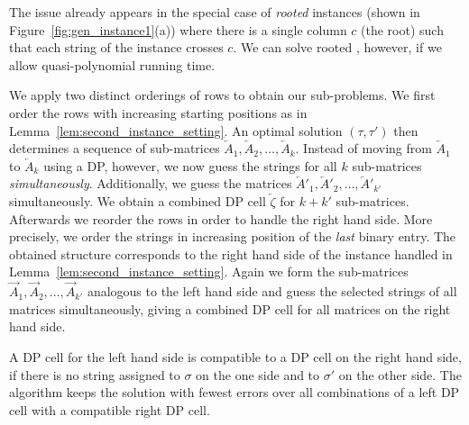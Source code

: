 The issue already appears in the special case of \emph{rooted} instances (shown in Figure~\ref{fig:gen_instance1}(a)) where there is a single column $c$ (the root) such that each string of the instance crosses $c$.
We can solve rooted \GMEC, however, if we allow quasi-polynomial running time.

We apply two distinct orderings of rows to obtain our sub-problems.
We first order the rows with increasing starting positions as in Lemma~\ref{lem:second_instance_setting}.
An optimal solution $(\tau,\tau')$ then determines a sequence of sub-matrices $\overleftarrow{A}_1,\overleftarrow{A}_2,\dotsc,\overleftarrow{A}_k$.
Instead of moving from $\overleftarrow{A}_1$ to $\overleftarrow{A}_k$ using a DP, however, we now guess the strings for all $k$ sub-matrices \emph{simultaneously}.
Additionally, we guess the matrices $\overleftarrow{A}'_1,\overleftarrow{A}'_2,\dotsc,\overleftarrow{A}'_{k'}$ simultaneously.
We obtain a combined DP cell $\overleftarrow{\zeta}$ for $k+k'$ sub-matrices.
Afterwards we reorder the rows in order to handle the right hand side.
More precisely, we order the strings in increasing position of the \emph{last} binary entry.
The obtained structure corresponds to the right hand side of the instance handled in Lemma~\ref{lem:second_instance_setting}.
Again we form the sub-matrices $\overrightarrow{A}_1,\overrightarrow{A}_2,\dotsc,\overrightarrow{A}_{k'}$ analogous to the left hand side and guess the selected strings of all matrices simultaneously, giving a combined DP cell for all matrices on the right hand side.

A DP cell for the left hand side is compatible to a DP cell on the right hand side, if there is no string assigned to $\sigma$ on the one side and to $\sigma'$ on the other side.
The algorithm keeps the solution with fewest errors over all combinations of a left DP cell with a compatible right DP cell.

